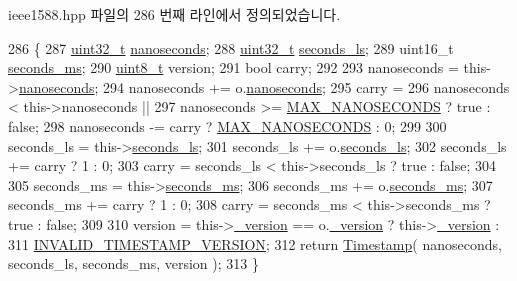 ieee1588.\+hpp 파일의 286 번째 라인에서 정의되었습니다.


\begin{DoxyCode}
286                                               \{
287         \hyperlink{parse_8c_a6eb1e68cc391dd753bc8ce896dbb8315}{uint32\_t} \hyperlink{class_timestamp_a78ae11d98fcfe738239d0a853d82c84a}{nanoseconds};
288         \hyperlink{parse_8c_a6eb1e68cc391dd753bc8ce896dbb8315}{uint32\_t} \hyperlink{class_timestamp_a2bf200e58cd268d8b86cf93c51500a44}{seconds\_ls};
289         uint16\_t \hyperlink{class_timestamp_a5d98378d782519e6f9c17db70f1620f0}{seconds\_ms};
290         \hyperlink{stdint_8h_aba7bc1797add20fe3efdf37ced1182c5}{uint8\_t} version;
291         \textcolor{keywordtype}{bool} carry;
292 
293         nanoseconds  = this->\hyperlink{class_timestamp_a78ae11d98fcfe738239d0a853d82c84a}{nanoseconds};
294         nanoseconds += o.\hyperlink{class_timestamp_a78ae11d98fcfe738239d0a853d82c84a}{nanoseconds};
295         carry =
296             nanoseconds < this->nanoseconds ||
297             nanoseconds >= \hyperlink{ieee1588_8hpp_ad461a8bebfaea4b50a4e8cc7f73be797}{MAX\_NANOSECONDS} ? \textcolor{keyword}{true} : \textcolor{keyword}{false};
298         nanoseconds -= carry ? \hyperlink{ieee1588_8hpp_ad461a8bebfaea4b50a4e8cc7f73be797}{MAX\_NANOSECONDS} : 0;
299 
300         seconds\_ls  = this->\hyperlink{class_timestamp_a2bf200e58cd268d8b86cf93c51500a44}{seconds\_ls};
301         seconds\_ls += o.\hyperlink{class_timestamp_a2bf200e58cd268d8b86cf93c51500a44}{seconds\_ls};
302         seconds\_ls += carry ? 1 : 0;
303         carry = seconds\_ls < this->seconds\_ls ? \textcolor{keyword}{true} : \textcolor{keyword}{false};
304 
305         seconds\_ms  = this->\hyperlink{class_timestamp_a5d98378d782519e6f9c17db70f1620f0}{seconds\_ms};
306         seconds\_ms += o.\hyperlink{class_timestamp_a5d98378d782519e6f9c17db70f1620f0}{seconds\_ms};
307         seconds\_ms += carry ? 1 : 0;
308         carry = seconds\_ms < this->seconds\_ms ? \textcolor{keyword}{true} : \textcolor{keyword}{false};
309 
310         version = this->\hyperlink{class_timestamp_a8fab72cfd922b5757580642c2309e9bd}{\_version} == o.\hyperlink{class_timestamp_a8fab72cfd922b5757580642c2309e9bd}{\_version} ? this->\hyperlink{class_timestamp_a8fab72cfd922b5757580642c2309e9bd}{\_version} :
311             \hyperlink{ieee1588_8hpp_af9fafbd7c14e721b2aae7fa09ae0a70a}{INVALID\_TIMESTAMP\_VERSION};
312         \textcolor{keywordflow}{return} \hyperlink{class_timestamp_a3ccb273b45fb16b1b14de8a4c8b44e3b}{Timestamp}( nanoseconds, seconds\_ls, seconds\_ms, version );
313     \}
\end{DoxyCode}

